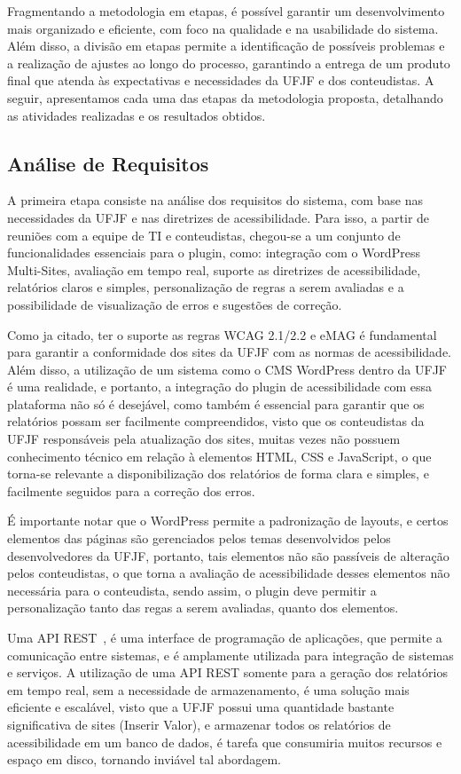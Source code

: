 \documentclass[
	article,			%
	12pt,				%
	oneside,			%
	a4paper,			%
	section=TITLE,		%
	subsection=TITLE,	%
	english,			%
	brazil,				%
	sumario=tradicional
	]{abntex2}
\begin{document}
Fragmentando a metodologia em etapas, é possível garantir um desenvolvimento
mais organizado e eficiente, com foco na qualidade e na usabilidade do sistema.
Além disso, a divisão em etapas permite a identificação de possíveis problemas
e a realização de ajustes ao longo do processo, garantindo a entrega de um
produto final que atenda às expectativas e necessidades da UFJF e dos
conteudistas. A seguir, apresentamos cada uma das etapas da metodologia
proposta, detalhando as atividades realizadas e os resultados obtidos.

\subsection{Análise de Requisitos}
A primeira etapa consiste na análise dos requisitos do sistema, com base nas
necessidades da UFJF e nas diretrizes de acessibilidade. Para isso, a partir
de reuniões com a equipe de TI e conteudistas, chegou-se a um conjunto de
funcionalidades essenciais para o plugin, como: integração com o WordPress
Multi-Sites, avaliação em tempo real, suporte as diretrizes de acessibilidade,
relatórios claros e simples, personalização de regras a serem avaliadas e a
possibilidade de visualização de erros e sugestões de correção.

Como ja citado, ter o suporte as regras WCAG 2.1/2.2 e eMAG é fundamental para
garantir a conformidade dos sites da UFJF com as normas de acessibilidade.
Além disso, a utilização de um sistema como o CMS WordPress dentro da UFJF
é uma realidade, e portanto, a integração do plugin de acessibilidade com
essa plataforma não só é desejável, como também é essencial para garantir
que os relatórios possam ser facilmente compreendidos, visto que os
conteudistas da UFJF responsáveis pela atualização dos sites, muitas
vezes não possuem conhecimento técnico em relação à elementos HTML,
CSS e JavaScript, o que torna-se relevante a disponibilização dos
relatórios de forma clara e simples, e facilmente seguidos para a
correção dos erros.

É importante notar que o WordPress permite a padronização de layouts,
e certos elementos das páginas são gerenciados pelos temas desenvolvidos pelos
desenvolvedores da UFJF, portanto, tais elementos não são passíveis de alteração
pelos conteudistas, o que torna a avaliação de acessibilidade desses elementos
não necessária para o conteudista, sendo assim, o plugin deve permitir a
personalização tanto das regas a serem avaliadas, quanto dos elementos.

Uma API REST~\cite{api}, é uma interface de programação de aplicações, que
permite a comunicação entre sistemas, e é amplamente utilizada para integração
de sistemas e serviços. A utilização de uma API REST somente para a geração
dos relatórios em tempo real, sem a necessidade de armazenamento, é uma
solução mais eficiente e escalável, visto que a UFJF possui uma quantidade
bastante significativa de sites (Inserir Valor), e armazenar todos os
relatórios de acessibilidade em um banco de dados, é tarefa que consumiria
muitos recursos e espaço em disco, tornando inviável tal abordagem.
\end{document}
